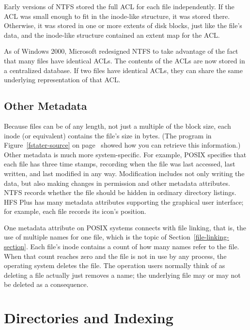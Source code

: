 Early versions of NTFS stored the full ACL for each file
independently.  If the ACL was small enough to fit in the inode-like
structure, it was stored there.  Otherwise, it was stored in one or
more extents of disk blocks, just like the file's data, and the
inode-like structure contained an extent map for the ACL.

As of Windows 2000, Microsoft redesigned NTFS to take advantage of the
fact that many files have identical ACLs.  The contents of the ACLs are
now stored in a centralized database.  If two files have identical
ACLs, they can share the same underlying representation of that ACL.

\subsection{Other Metadata}\label{other-metadata-section}

Because files can be of any length, not just a multiple of the block
size, each inode (or equivalent) contains the file's size in bytes.
(The program in Figure~\ref{fstater-source} on page~\pageref{fstater-source} showed how you can
retrieve this information.)  Other metadata is much more
system-specific.  For example, POSIX specifies that each file has
three time stamps, recording when the file was last accessed, last
written, and last modified in any way. Modification includes not only  writing the
data, but also making changes in
permission and other metadata attributes.  NTFS records whether
the file should be hidden in ordinary directory listings.  HFS Plus
has many metadata attributes supporting the graphical user interface;
for example, each file records its icon's position.

One metadata attribute on POSIX systems connects with file linking,
that is, the use of multiple names for one file, which is the
topic of Section~\ref{file-linking-section}.  Each file's inode contains a count of how many names
refer to the file.  When that count reaches zero and the file is not
in use by any process, the operating system deletes the file.  The
operation users normally think of as deleting a file actually just
removes a name; the underlying file may or may not be deleted as a
consequence.

\section{Directories and Indexing}
\label{directory-indexing-section}

